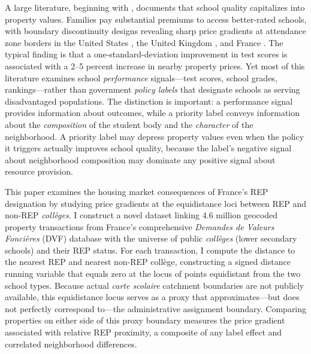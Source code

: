\documentclass[12pt]{article}
\begin{document}
A large literature, beginning with \citet{black1999}, documents that school quality capitalizes into property values. Families pay substantial premiums to access better-rated schools, with boundary discontinuity designs revealing sharp price gradients at attendance zone borders in the United States \citep{bayer2007, kane2006, cellini2010}, the United Kingdom \citep{gibbons2013, cheshire2004, machin2011}, and France \citep{fack2010}. The typical finding is that a one-standard-deviation improvement in test scores is associated with a 2--5 percent increase in nearby property prices. Yet most of this literature examines school \textit{performance} signals---test scores, school grades, rankings---rather than government \textit{policy labels} that designate schools as serving disadvantaged populations. The distinction is important: a performance signal provides information about outcomes, while a priority label conveys information about the \textit{composition} of the student body and the \textit{character} of the neighborhood. A priority label may depress property values even when the policy it triggers actually improves school quality, because the label's negative signal about neighborhood composition may dominate any positive signal about resource provision.

This paper examines the housing market consequences of France's REP designation by studying price gradients at the equidistance loci between REP and non-REP \textit{coll\`{e}ges}. I construct a novel dataset linking 4.6 million geocoded property transactions from France's comprehensive \textit{Demandes de Valeurs Fonci\`{e}res} (DVF) database with the universe of public \textit{coll\`{e}ges} (lower secondary schools) and their REP status. For each transaction, I compute the distance to the nearest REP and nearest non-REP coll\`{e}ge, constructing a signed distance running variable that equals zero at the locus of points equidistant from the two school types. Because actual \textit{carte scolaire} catchment boundaries are not publicly available, this equidistance locus serves as a proxy that approximates---but does not perfectly correspond to---the administrative assignment boundary. Comparing properties on either side of this proxy boundary measures the price gradient associated with relative REP proximity, a composite of any label effect and correlated neighborhood differences.
\end{document}

